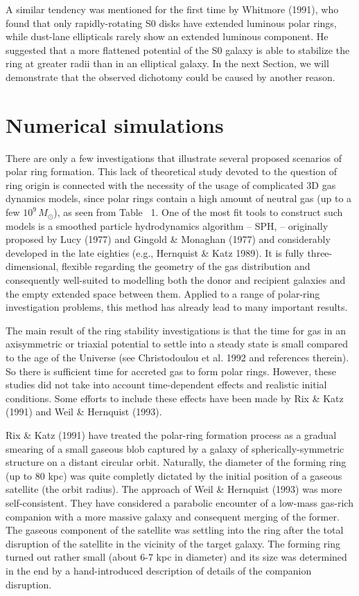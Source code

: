 A similar tendency was mentioned for the first time by Whitmore (1991),  
who found that only rapidly-rotating S0 disks have 
extended luminous polar rings, while dust-lane ellipticals rarely
show an extended luminous component. He suggested that a more
flattened potential of the S0 galaxy is able to stabilize
the ring at greater radii than in an elliptical galaxy. 
In the next Section, we will demonstrate that the observed dichotomy 
could be caused by another reason.
 
\section{Numerical simulations}

There are only a few  
investigations that illustrate several proposed scenarios of 
polar ring formation. 
This lack of theoretical study devoted 
to the question of ring origin is connected with the necessity 
of the usage of complicated 3D gas dynamics models, since polar
rings contain a high amount of neutral gas (up to a few 
$10^9 \, M_{\odot}$), as seen from Table~ 1. 
One of the 
most fit tools to construct such models is a smoothed particle 
hydrodynamics algorithm -- SPH, -- originally proposed by Lucy (1977) 
and Gingold \& Monaghan (1977) and considerably developed in the 
late eighties (e.g., Hernquist \& Katz 1989). It is fully 
three-dimensional, flexible regarding the geometry of the gas 
distribution and consequently well-suited to modelling both the 
donor and recipient galaxies and the empty extended space between them. 
Applied to a range of polar-ring investigation problems, this 
method has already lead to many important results. 

The main result of the ring stability investigations is that the 
time for gas in an axisymmetric or triaxial potential to settle 
into a steady state is small compared to the age of the Universe 
(see Christodoulou et al. 1992 and references therein). So there is 
sufficient time for accreted gas to form polar rings. However, 
these studies did not take into account time-dependent effects 
and realistic initial conditions. Some efforts to include these 
effects have been made by Rix \& Katz (1991) and 
Weil \& Hernquist (1993). 

Rix \& Katz (1991) have treated the polar-ring formation process as 
a gradual smearing of a small gaseous blob captured by a galaxy of 
spherically-symmetric structure on a distant circular orbit. Naturally, 
the diameter of the forming ring (up to 80 kpc) was quite completly 
dictated by the initial position of a gaseous satellite (the orbit 
radius). The approach of Weil \& Hernquist (1993) was more 
self-consistent. They have considered a parabolic encounter of a 
low-mass gas-rich companion with a more massive galaxy and consequent 
merging of the former. The gaseous component of the satellite was 
settling into the ring after the total disruption of the satellite 
in the vicinity of the target galaxy. The forming ring 
turned out rather small (about 6-7 kpc in diameter) and its size was 
determined in the end by a hand-introduced description of details of 
the companion disruption. 

